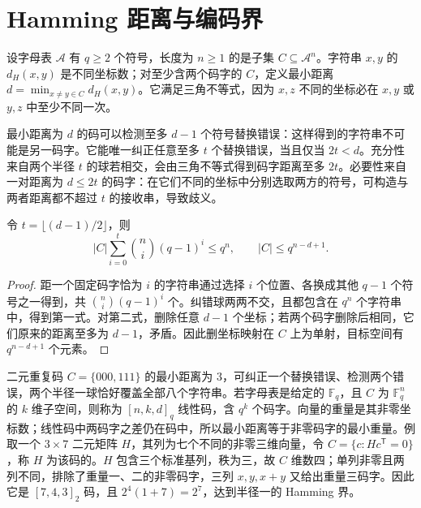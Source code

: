 \documentclass[UTF8,12pt,a4paper,fontset=fandol]{ctexbook}
\begin{document}
\section{Hamming 距离与编码界}

设字母表 $\mathcal A$ 有 $q\ge2$ 个符号，长度为 $n\ge1$ 的是子集 $C\subseteq\mathcal A^n$。字符串 $x,y$ 的 $d_H(x,y)$ 是不同坐标数；对至少含两个码字的 $C$，定义最小距离 $d=\min_{x\ne y\in C}d_H(x,y)$。它满足三角不等式，因为 $x,z$ 不同的坐标必在 $x,y$ 或 $y,z$ 中至少不同一次。

最小距离为 $d$ 的码可以检测至多 $d-1$ 个符号替换错误：这样得到的字符串不可能是另一码字。它能唯一纠正任意至多 $t$ 个替换错误，当且仅当 $2t<d$。充分性来自两个半径 $t$ 的球若相交，会由三角不等式得到码字距离至多 $2t$。必要性来自一对距离为 $d\le2t$ 的码字：在它们不同的坐标中分别选取两方的符号，可构造与两者距离都不超过 $t$ 的接收串，导致歧义。

\begin{theorem}
令 $t=\lfloor(d-1)/2\rfloor$，则
\begin{equation}
 |C|\sum_{i=0}^t\binom ni(q-1)^i\le q^n,
 \qquad |C|\le q^{n-d+1}.
 \label{eq:coding-bounds}
\end{equation}
\end{theorem}
\begin{proof}
距一个固定码字恰为 $i$ 的字符串通过选择 $i$ 个位置、各换成其他 $q-1$ 个符号之一得到，共 $\binom ni(q-1)^i$ 个。纠错球两两不交，且都包含在 $q^n$ 个字符串中，得到第一式。对第二式，删除任意 $d-1$ 个坐标；若两个码字删除后相同，它们原来的距离至多为 $d-1$，矛盾。因此删坐标映射在 $C$ 上为单射，目标空间有 $q^{n-d+1}$ 个元素。
\end{proof}

二元重复码 $C=\{000,111\}$ 的最小距离为 $3$，可纠正一个替换错误、检测两个错误，两个半径一球恰好覆盖全部八个字符串。若字母表是给定的 $\mathbb F_q$，且 $C$ 为 $\mathbb F_q^n$ 的 $k$ 维子空间，则称为 $[n,k,d]_q$ 线性码，含 $q^k$ 个码字。向量的重量是其非零坐标数；线性码中两码字之差仍在码中，所以最小距离等于非零码字的最小重量。例取一个 $3\times7$ 二元矩阵 $H$，其列为七个不同的非零三维向量，令 $C=\{c:Hc^{\mathsf T}=0\}$，称 $H$ 为该码的。$H$ 包含三个标准基列，秩为三，故 $C$ 维数四；单列非零且两列不同，排除了重量一、二的非零码字，三列 $x,y,x+y$ 又给出重量三码字。因此它是 $[7,4,3]_2$ 码，且 $2^4(1+7)=2^7$，达到半径一的 Hamming 界。
\end{document}

